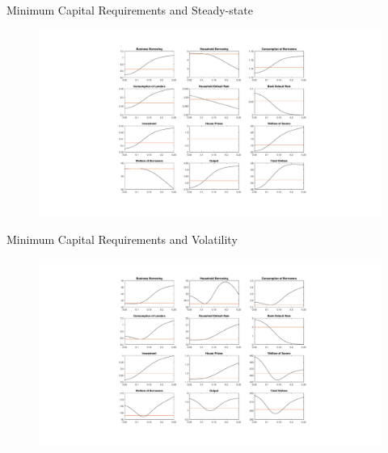 \documentclass[8pt,aspectratio=169]{beamer}
\numberwithin{equation}{section}
\begin{document}
\begin{frame}{Minimum Capital Requirements and Steady-state}

\begin{figure}[H]
\centering
\includegraphics[scale=0.3]{WA2_level.pdf}\\

\end{figure}

\end{frame}


\begin{frame}{Minimum Capital Requirements and Volatility}

\begin{figure}[H]
\centering
\includegraphics[scale=0.3]{WA2_var.pdf}
\end{figure}

\end{frame}
\end{document}
